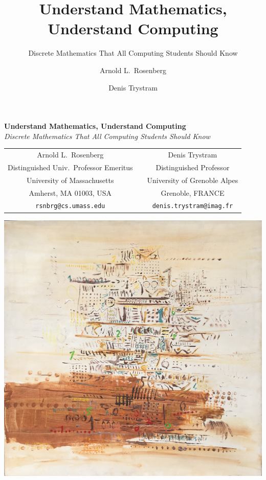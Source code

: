 \documentclass[envcountchap]{svmono}
\begin{document}




\author{Arnold L.~Rosenberg \and Denis Trystram}
\title{Understand Mathematics, Understand Computing}
\subtitle{Discrete Mathematics That All Computing Students Should Know}

\maketitle

\begin{center}
{\Large\bf Understand Mathematics, Understand Computing} \\
{\large\it Discrete Mathematics That All Computing Students Should Know}
\end{center}


\begin{center}
\begin{tabular}{ccc}
{\large Arnold L.~Rosenberg} & & {\large Denis Trystram} \\
Distinguished Univ.~Professor Emeritus
  & & Distinguished Professor \\
University of Massachusetts  & & University of Grenoble Alpes \\
Amherst, MA 01003, USA       & & Grenoble, FRANCE \\
{\small\tt rsnbrg@cs.umass.edu} & & {\small\tt denis.trystram@imag.fr}
\end{tabular}
\end{center}

\frontmatter


\vspace*{.25in}

\centerline{\includegraphics[scale=0.56]{AdditionForSpringer.png}}
\end{document}
